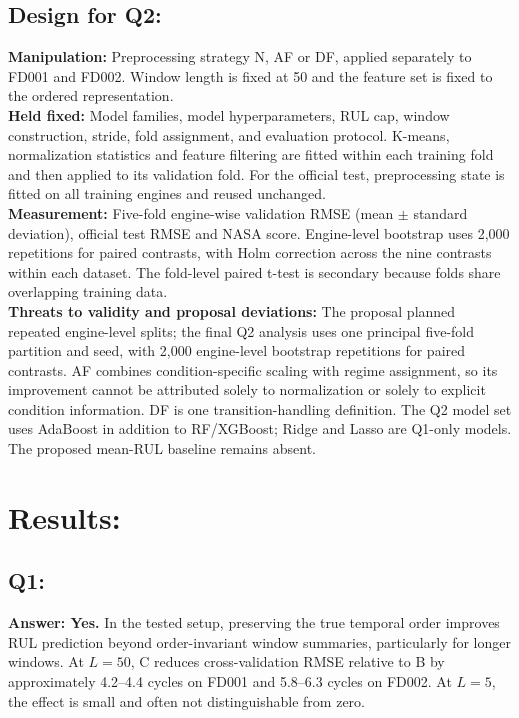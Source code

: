 \documentclass[10pt,a4paper]{article}
\begin{document}
\subsection{Design for Q2:}
\textbf{Manipulation:} Preprocessing strategy N, AF or DF, applied separately to FD001 and FD002. Window length is fixed at 50 and the feature set is fixed to the ordered representation.\\
\textbf{Held fixed:} Model families, model hyperparameters, RUL cap, window construction, stride, fold assignment, and evaluation protocol. K-means, normalization statistics and feature filtering are fitted within each training fold and then applied to its validation fold. For the official test, preprocessing state is fitted on all training engines and reused unchanged.\\
\textbf{Measurement:} Five-fold engine-wise validation RMSE (mean $\pm$ standard deviation), official test RMSE and NASA score. Engine-level bootstrap uses 2,000 repetitions for paired contrasts, with Holm correction across the nine contrasts within each dataset. The fold-level paired t-test is secondary because folds share overlapping training data.\\
\textbf{Threats to validity and proposal deviations:} The proposal planned repeated engine-level splits; the final Q2 analysis uses one principal five-fold partition and seed, with 2,000 engine-level bootstrap repetitions for paired contrasts. AF combines condition-specific scaling with regime assignment, so its improvement cannot be attributed solely to normalization or solely to explicit condition information. DF is one transition-handling definition. The Q2 model set uses AdaBoost in addition to RF/XGBoost; Ridge and Lasso are Q1-only models. The proposed mean-RUL baseline remains absent.

\section{Results:}
\subsection{Q1:}
\textbf{Answer: Yes.} In the tested setup, preserving the true temporal order improves RUL prediction beyond order-invariant window summaries, particularly for longer windows. At $L=50$, C reduces cross-validation RMSE relative to B by approximately 4.2--4.4 cycles on FD001 and 5.8--6.3 cycles on FD002. At $L=5$, the effect is small and often not distinguishable from zero.
\end{document}

